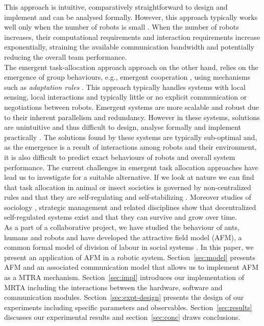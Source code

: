 \documentclass{llncs}
\begin{document}
This approach is intuitive, comparatively straightforward to design and implement and can be analysed formally.
However, this approach typically works well only when the number of robots is small \cite{Lerman+2006}.
When the number of robots increases, their computational requirements and interaction requirements increase exponentially, straining the available communication bandwidth and potentially reducing the overall team performance.\\
The emergent task-allocation approach approach on the other hand, relies on the emergence of group behaviours, e.g., emergent cooperation \cite{Lerman+2006}, using mechanisms such as {\em adaptation rules} \cite{Liu+2007}.
This approach typically handles systems with local sensing, local interactions and typically little or no explicit communication or negotiations between robots.
Emergent systems are more scalable and robust due to their inherent parallelism and redundancy.
However in these systems, solutions are unintuitive and thus difficult to design, analyse formally and implement practically \cite{Gerkey+2004,Lerman+2006}.
The solutions found by these systems are typically sub-optimal and, as the emergence is a result of interactions among robots and their environment, it is also difficult to predict exact behaviours of robots and overall system performance.
The current challenges in emergent task allocation approaches have lead us to investigate for a suitable alternative.
If we look at nature we can find that task allocation in animal or insect societies is governed by non-centralized rules and that they are self-regulating and self-stabilizing \cite{Camazine+2001,Bonabeau+1999}.
Moreover studies of sociology \cite{Sayer+1992}, strategic management \cite{Kogut2000} and related disciplines show that decentralized self-regulated systems exist and that they can survive and grow over time.\\
As a part of a collaborative project, we have studied the behaviour of ants, humans and robots and have developed the attractive field model (AFM), a common formal model of division of labour in social systems \cite{Elsa}.
In this paper, we present an application of AFM in a robotic system.
Section~\ref{sec:model} presents AFM and an associated communication model that allows us to implement AFM as a MTRA mechanism.
Section~\ref{sec:impl} introduces our implementation of MRTA including the interactions between the hardware, software and communication modules.
Section~\ref{sec:expt-design} presents the design of our experiments including specific parameters and observables.
Section~\ref{sec:results} discusses our experimental results and section~\ref{sec:conc} draws conclusions.
\end{document}
